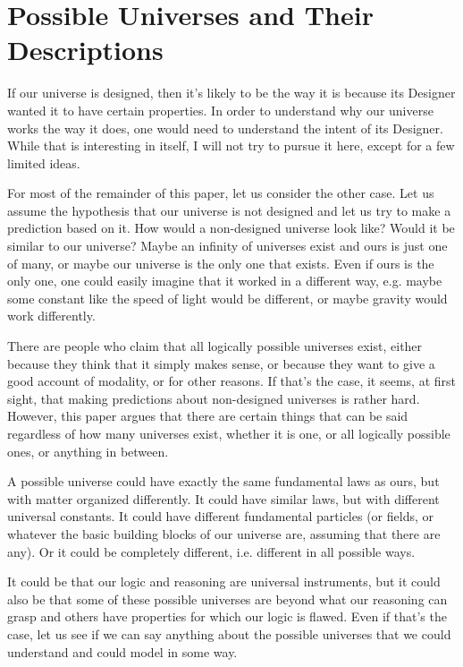 \documentclass[a4paper
,draft
]{article}
\newcommand{\paper}[1]{paper}
\begin{document}

\section{Possible Universes and Their Descriptions}
\label{sec:possible-universes}

If our universe is designed, then it's likely to be the way it is because
its Designer wanted it to have certain properties.
In order to understand why our universe works the way it does,
one would need to understand the intent of its Designer.
While that is interesting in itself, I will not try to pursue it here,
except for a few limited ideas.

For most of the remainder of this \paper{}, let us consider the other case.
Let us assume the hypothesis that our universe is not designed
and let us try to make a prediction based on it.
How would a non-designed universe look like?
Would it be similar to our universe?
Maybe an infinity of universes exist and ours is just one of many,
or maybe our universe is the only one that exists.
Even if ours is the only one, one could easily imagine that it worked
in a different way, e.g. maybe some constant like the speed of light would be
different, or maybe gravity would work differently.

There are people who claim that all logically possible universes exist,
either because they think that it simply makes sense, or because they want to
give a good account of modality, or for other reasons.
If that's the case, it seems, at first sight, that making predictions about
non-designed universes is rather hard.
However, this \paper{} argues that there are certain things that can be said
regardless of how many universes exist, whether it is one, or all logically
possible ones, or anything in between.

A possible universe
could have exactly the same fundamental laws as ours, but with matter
organized differently.
It could have similar laws, but with different universal constants.
It could have different fundamental particles (or fields, or whatever the basic
building blocks of our universe are, assuming that there are any).
Or it could be completely different, i.e. different in all possible ways.

It could be that our logic and reasoning are universal instruments,
but it could also be that some of these possible universes are
beyond what our reasoning can grasp and others have properties
for which our logic is flawed.
Even if that's the case, let us see if we can say anything about
the possible universes that we could understand and could model in some way.
\end{document}
